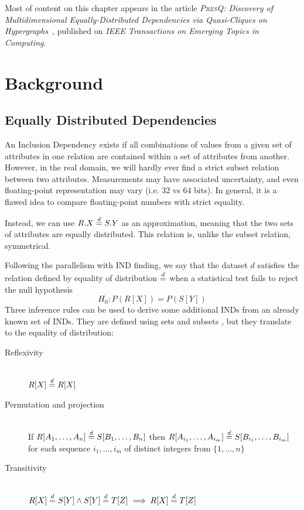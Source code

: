 Most of content on this chapter appears in the article
\emph{\textsc{PresQ}: Discovery of Multidimensional Equally-Distributed Dependencies via Quasi-Cliques on Hypergraphs}~\cite{AlvarezAyllonPresQ2022},
published on \emph{IEEE Transactions on Emerging Topics in Computing}.



\section{Background}
\label{sec:background}

\subsection{Equally Distributed Dependencies}
\label{sec:edd}
An Inclusion Dependency exists if all combinations of
values from a given set of attributes in one relation are contained within
a set of attributes from another.
However, in the real domain, we will hardly ever find a strict
subset relation between two attributes. Measurements may have associated uncertainty,
and even floating-point representation may vary (i.e. 32 vs 64 bits). In general, it is a
flawed idea to compare floating-point numbers with strict equality.

Instead, we can use $R.X \stackrel{d}{=} S.Y$ as an approximation, meaning that the two sets of
attributes are equally distributed. This relation is, unlike the subset relation, symmetrical.

Following the parallelism with \gls{IND} finding, we say that the dataset $d$ satisfies
the relation defined by equality of distribution $\stackrel{d}{=}$ when a statistical test
fails to reject the null hypothesis
\begin{equation}
    H_0: P(R[X]) = P(S[Y])
    \label{eq:eqdist}
\end{equation}
Three inference rules can be used to derive some additional \glspl{IND} from an already known
set of \glspl{IND}. They are defined using sets and subsets \cite{Casanova1984},
but they translate to the equality of distribution:

\begin{description}
    \item[Reflexivity] \hfill \\
        $R[X] \stackrel{d}{=} R[X]$
    \item[Permutation and projection] \hfill \\
        If $R[A_1,\dots,A_n] \stackrel{d}{=} S[B_1,\dots,B_n]$ then
        $R[A_{i_1},\dots,A_{i_m}] \stackrel{d}{=} S[B_{i_1},\dots,B_{i_m}]$ for each sequence
        $i_1,\dots,i_m$ of distinct integers from $\{1,\dots,n\}$
    \item[Transitivity] \hfill \\
        $ R[X] \stackrel{d}{=} S[Y] \land S[Y] \stackrel{d}{=} T[Z] \implies R[X] \stackrel{d}{=} T[Z]$
\end{description}

